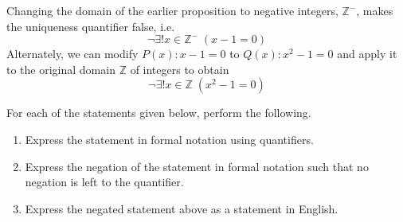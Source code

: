 \documentclass[addpoints]{exam}
\begin{document}
\begin{questions}
\begin{parts}
\begin{solution}
      Changing the domain of the earlier proposition to negative integers, $\mathbb{Z^{-}}$, makes the uniqueness quantifier false, i.e.
      \[
        \lnot \exists! x\in\mathbb{Z^{-}}\; (x-1=0)
      \]
      Alternately, we can modify $P(x)\colon x-1=0$ to $Q(x)\colon x^2-1=0$ and apply it to the original domain $\mathbb{Z}$ of integers to obtain
      \[
        \lnot \exists! x\in\mathbb{Z}\; (x^2-1=0)
      \]
    \end{solution}
  \end{parts}

  
\question
  For each of the statements given below, perform the following.
  \begin{enumerate}
  \item Express the statement in formal notation using quantifiers.
  \item Express the negation of the statement in formal notation such that no negation is left to the quantifier.
  \item Express the negated statement above as a statement in English.
  \end{enumerate}

\end{questions}
\end{document}
